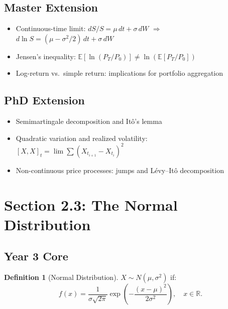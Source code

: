 \documentclass[11pt, a4paper]{article}
\newcommand{\E}{\mathbb{E}}
\newcommand{\R}{\mathbb{R}}
\theoremstyle{definition}
\newtheorem{defn}{Definition}
\begin{document}
\subsection{Master Extension}
\begin{itemize}
  \item Continuous-time limit: $dS/S = \mu\,dt + \sigma\,dW$ $\Rightarrow$ $d\ln S = (\mu - \sigma^2/2)\,dt + \sigma\,dW$
  \item Jensen's inequality: $\E[\ln(P_T/P_0)] \neq \ln(\E[P_T/P_0])$
  \item Log-return vs.\ simple return: implications for portfolio aggregation
\end{itemize}

\subsection{PhD Extension}
\begin{itemize}
  \item Semimartingale decomposition and Itô's lemma
  \item Quadratic variation and realized volatility: $[X,X]_t = \lim \sum (X_{t_{i+1}} - X_{t_i})^2$
  \item Non-continuous price processes: jumps and Lévy--Itô decomposition
\end{itemize}

\section{Section 2.3: The Normal Distribution}

\subsection{Year 3 Core}

\begin{defn}[Normal Distribution]
$X \sim N(\mu, \sigma^2)$ if:
\[
  f(x) = \frac{1}{\sigma\sqrt{2\pi}}\exp\!\left(-\frac{(x-\mu)^2}{2\sigma^2}\right), \quad x \in \R.
\]
\end{defn}
\end{document}
